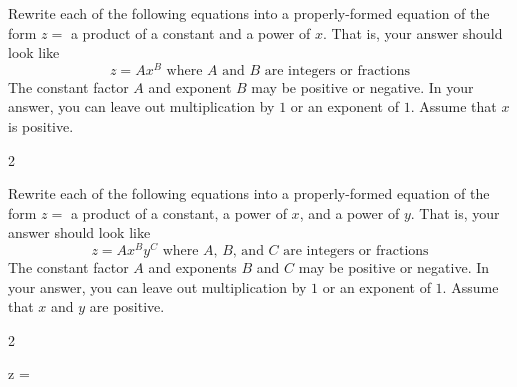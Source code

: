 
Rewrite each of the following equations into a properly-formed equation of the form $z = $ a product of a constant and a power of $x$.
That is, your answer should look like
\begin{equation*}
 z = A x^B \text{ where $A$ and $B$ are integers or fractions}
\end{equation*}
The constant factor $A$ and exponent $B$ may be positive or negative.
In your answer, you can leave out multiplication by $1$ or an exponent of $1$.
Assume that $x$ is positive.

\begin{multicols}{2}
 \begin{ProblemSet}[pencil space=1.25in]
 \end{ProblemSet}
\end{multicols}


\newpage

Rewrite each of the following equations into a properly-formed equation of the form $z = $ a product of a constant, a power of $x$, and a power of $y$.
That is, your answer should look like
\begin{equation*}
 z = A x^B y^C \text{ where $A$, $B$, and $C$ are integers or fractions}
\end{equation*}
The constant factor $A$ and exponents $B$ and $C$ may be positive or negative.
In your answer, you can leave out multiplication by $1$ or an exponent of $1$.
Assume that $x$ and $y$ are positive.

\begin{multicols}{2}
 \begin{ProblemSet}[pencil space=2in]


  \begin{Problem}[pencil space=2in]
   \Large
   \begin{LeftEquation}
    z = 
   \end{LeftEquation}
  \end{Problem}

 \end{ProblemSet}
\end{multicols}


